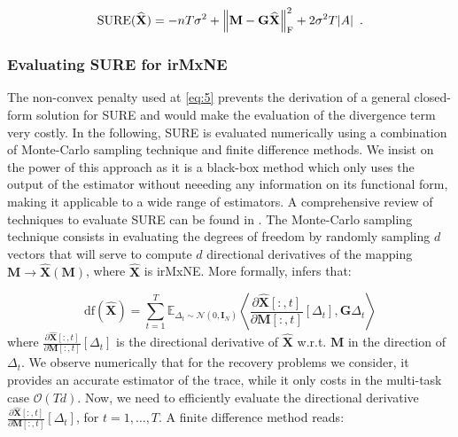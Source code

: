 \begin{equation} \label{eq:8}
    \text{SURE}(\widehat{\mathbf{X}})
    = -nT\sigma^2 + \left \lVert 
        \mathbf{M} - \mathbf{G}\widehat{\mathbf{X}}
     \right \rVert_{\text{F}}^2
    + 2 \sigma^2 T \lvert A \rvert
    \enspace .
\end{equation}

\subsubsection{Evaluating SURE for irMxNE}

The non-convex penalty used at \eqref{eq:5} prevents the derivation of a general closed-form solution for SURE and would make 
the evaluation of the divergence term very costly. In the following, 
SURE is evaluated numerically using a combination of Monte-Carlo sampling technique and finite difference methods. 
We insist on the power of this approach as it is a black-box method which only uses the output of the estimator without neeeding
any information on its functional form, making it applicable to a wide range of estimators.
A comprehensive review of techniques to evaluate SURE can be found in \cite{Deledalle_Vaiter_Fadili_Peyre14}.
The Monte-Carlo sampling technique consists in evaluating the degrees of freedom by randomly sampling $d$ vectors that will 
serve to compute $d$ directional derivatives of the mapping $\mathbf{M} \rightarrow \widehat{\mathbf{X}}(\mathbf{M})$, where 
$\widehat{\mathbf{X}}$ is irMxNE. More formally, \cite{Deledalle_Vaiter_Fadili_Peyre14} infers that:

\begin{equation} \label{eq:9}
    \text{df}(\widehat{\mathbf{X}}) = 
    \sum_{t=1}^T
    \mathbb{E}_{\Delta_t \sim \mathcal{N}(0, \mathbf{I}_N)}
    \left\langle
        \frac{
            \partial \widehat{\mathbf{X}}[:, t]
        }{
            \partial \mathbf{M}[:, t]
        }[\Delta_t],
        \mathbf{G}\Delta_t
    \right\rangle
\end{equation}
%
where $\frac{\partial \widehat{\mathbf{X}}[:, t]}{\partial \mathbf{M}[:, t]}[\Delta_t]$ is the directional derivative of $\widehat{\mathbf{X}}$ w.r.t.
$\mathbf{M}$ in the direction of $\Delta_t$.
We observe numerically that for the recovery problems we consider, it provides an accurate estimator of the trace, while it only
costs in the multi-task case $\mathcal{O}(Td)$. Now, we need to efficiently evaluate the directional derivative 
$\frac{\partial \widehat{\mathbf{X}}[:, t]}{\partial \mathbf{M}[:, t]}[\Delta_t]$, for $t=1,\dots, T$. A finite difference method reads:

